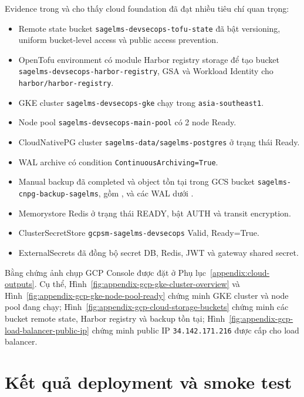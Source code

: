 Evidence trong  và  cho thấy cloud foundation đã đạt nhiều tiêu chí quan trọng:

\begin{itemize}
  \item Remote state bucket \texttt{sagelms-devsecops-tofu-state} đã bật versioning, uniform bucket-level access và public access prevention.
  \item OpenTofu environment có module Harbor registry storage để tạo bucket \texttt{sagelms-devsecops-harbor-registry}, GSA và Workload Identity cho \texttt{harbor/harbor-registry}.
  \item GKE cluster \texttt{sagelms-devsecops-gke} chạy trong \texttt{asia-southeast1}.
  \item Node pool \texttt{sagelms-devsecops-main-pool} có 2 node Ready.
  \item CloudNativePG cluster \texttt{sagelms-data/sagelms-postgres} ở trạng thái Ready.
  \item WAL archive có condition \texttt{ContinuousArchiving=True}.
  \item Manual backup đã completed và object tồn tại trong GCS bucket \texttt{sagelms-cnpg-backup-sagelms}, gồm ,  và các WAL  dưới .
  \item Memorystore Redis ở trạng thái READY, bật AUTH và transit encryption.
  \item ClusterSecretStore \texttt{gcpsm-sagelms-devsecops} Valid, Ready=True.
  \item ExternalSecrets đã đồng bộ secret DB, Redis, JWT và gateway shared secret.
\end{itemize}

Bằng chứng ảnh chụp GCP Console được đặt ở Phụ lục~\ref{appendix:cloud-outputs}. Cụ thể, Hình~\ref{fig:appendix-gcp-gke-cluster-overview} và Hình~\ref{fig:appendix-gcp-gke-node-pool-ready} chứng minh GKE cluster và node pool đang chạy; Hình~\ref{fig:appendix-gcp-cloud-storage-buckets} chứng minh các bucket remote state, Harbor registry và backup tồn tại; Hình~\ref{fig:appendix-gcp-load-balancer-public-ip} chứng minh public IP \texttt{34.142.171.216} được cấp cho load balancer.


\section{Kết quả deployment và smoke test}

